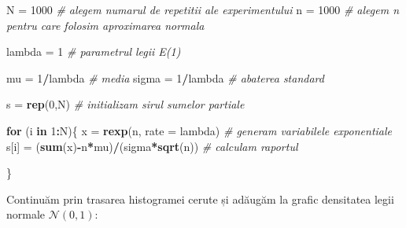 \documentclass[]{article}
\newenvironment{Shaded}{\begin{snugshade}}{\end{snugshade}}
\newcommand{\KeywordTok}[1]{\textcolor[rgb]{0.13,0.29,0.53}{\textbf{#1}}}
\newcommand{\DataTypeTok}[1]{\textcolor[rgb]{0.13,0.29,0.53}{#1}}
\newcommand{\DecValTok}[1]{\textcolor[rgb]{0.00,0.00,0.81}{#1}}
\newcommand{\StringTok}[1]{\textcolor[rgb]{0.31,0.60,0.02}{#1}}
\newcommand{\CommentTok}[1]{\textcolor[rgb]{0.56,0.35,0.01}{\textit{#1}}}
\newcommand{\ControlFlowTok}[1]{\textcolor[rgb]{0.13,0.29,0.53}{\textbf{#1}}}
\newcommand{\OperatorTok}[1]{\textcolor[rgb]{0.81,0.36,0.00}{\textbf{#1}}}
\newcommand{\NormalTok}[1]{#1}
\begin{document}
\begin{Shaded}
\begin{Highlighting}[]
\NormalTok{N =}\StringTok{ }\DecValTok{1000} \CommentTok{# alegem numarul de repetitii ale experimentului}
\NormalTok{n =}\StringTok{ }\DecValTok{1000} \CommentTok{# alegem n pentru care folosim aproximarea normala}

\NormalTok{lambda =}\StringTok{ }\DecValTok{1} \CommentTok{# parametrul legii E(1)}

\NormalTok{mu =}\StringTok{ }\DecValTok{1}\OperatorTok{/}\NormalTok{lambda }\CommentTok{# media}
\NormalTok{sigma =}\StringTok{ }\DecValTok{1}\OperatorTok{/}\NormalTok{lambda }\CommentTok{# abaterea standard }

\NormalTok{s =}\StringTok{ }\KeywordTok{rep}\NormalTok{(}\DecValTok{0}\NormalTok{,N) }\CommentTok{# initializam sirul sumelor partiale}

\ControlFlowTok{for}\NormalTok{ (i }\ControlFlowTok{in} \DecValTok{1}\OperatorTok{:}\NormalTok{N)\{}
\NormalTok{  x =}\StringTok{ }\KeywordTok{rexp}\NormalTok{(n, }\DataTypeTok{rate =}\NormalTok{ lambda) }\CommentTok{# generam variabilele exponentiale}
\NormalTok{  s[i] =}\StringTok{ }\NormalTok{(}\KeywordTok{sum}\NormalTok{(x)}\OperatorTok{-}\NormalTok{n}\OperatorTok{*}\NormalTok{mu)}\OperatorTok{/}\NormalTok{(sigma}\OperatorTok{*}\KeywordTok{sqrt}\NormalTok{(n)) }\CommentTok{# calculam raportul }
  
\NormalTok{\}}
\end{Highlighting}
\end{Shaded}

Continuăm prin trasarea histogramei cerute și adăugăm la grafic
densitatea legii normale \(\mathcal{N}(0,1)\):
\end{document}
